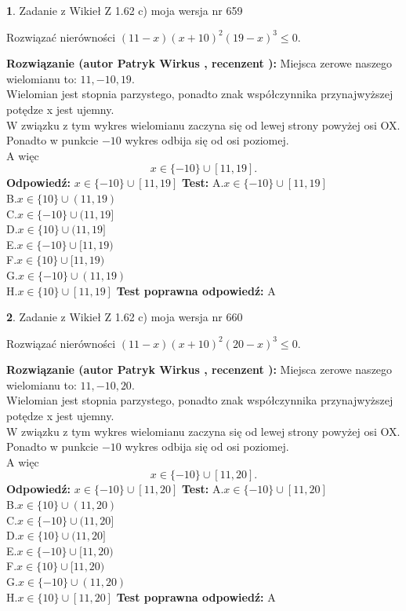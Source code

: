 \documentclass[12pt, a4paper]{article}
\theoremstyle{definition} %
\newtheorem{zad}{}
\newcommand{\zadStart}[1]{\begin{zad}#1\newline}
\newcommand{\zadStop}{\end{zad}}
\newcommand{\rozwStart}[2]{\noindent \textbf{Rozwiązanie (autor #1 , recenzent #2): }\newline}
\newcommand{\rozwStop}{\newline}
\newcommand{\odpStart}{\noindent \textbf{Odpowiedź:}\newline}
\newcommand{\odpStop}{\newline}
\newcommand{\testStart}{\noindent \textbf{Test:}\newline}
\newcommand{\testStop}{\newline}
\newcommand{\kluczStart}{\noindent \textbf{Test poprawna odpowiedź:}\newline}
\newcommand{\kluczStop}{\newline}
\begin{document}
\zadStart{Zadanie z Wikieł Z 1.62 c) moja wersja nr 659}

Rozwiązać nierówności $(11-x)(x+10)^{2}(19-x)^{3}\le0$.
\zadStop
\rozwStart{Patryk Wirkus}{}
Miejsca zerowe naszego wielomianu to: $11, -10, 19$.\\
Wielomian jest stopnia parzystego, ponadto znak współczynnika przy\linebreak najwyższej potędze x jest ujemny.\\ W związku z tym wykres wielomianu zaczyna się od lewej strony powyżej osi OX.\\
Ponadto w punkcie $-10$ wykres odbija się od osi poziomej.\\
A więc $$x \in \{-10\} \cup [11,19].$$
\rozwStop
\odpStart
$x \in \{-10\} \cup [11,19]$
\odpStop
\testStart
A.$x \in \{-10\} \cup [11,19]$\\
B.$x \in \{10\} \cup (11,19)$\\
C.$x \in \{-10\} \cup (11,19]$\\
D.$x \in \{10\} \cup (11,19]$\\
E.$x \in \{-10\} \cup [11,19)$\\
F.$x \in \{10\} \cup [11,19)$\\
G.$x \in \{-10\} \cup (11,19)$\\
H.$x \in \{10\} \cup [11,19]$
\testStop
\kluczStart
A
\kluczStop



\zadStart{Zadanie z Wikieł Z 1.62 c) moja wersja nr 660}

Rozwiązać nierówności $(11-x)(x+10)^{2}(20-x)^{3}\le0$.
\zadStop
\rozwStart{Patryk Wirkus}{}
Miejsca zerowe naszego wielomianu to: $11, -10, 20$.\\
Wielomian jest stopnia parzystego, ponadto znak współczynnika przy\linebreak najwyższej potędze x jest ujemny.\\ W związku z tym wykres wielomianu zaczyna się od lewej strony powyżej osi OX.\\
Ponadto w punkcie $-10$ wykres odbija się od osi poziomej.\\
A więc $$x \in \{-10\} \cup [11,20].$$
\rozwStop
\odpStart
$x \in \{-10\} \cup [11,20]$
\odpStop
\testStart
A.$x \in \{-10\} \cup [11,20]$\\
B.$x \in \{10\} \cup (11,20)$\\
C.$x \in \{-10\} \cup (11,20]$\\
D.$x \in \{10\} \cup (11,20]$\\
E.$x \in \{-10\} \cup [11,20)$\\
F.$x \in \{10\} \cup [11,20)$\\
G.$x \in \{-10\} \cup (11,20)$\\
H.$x \in \{10\} \cup [11,20]$
\testStop
\kluczStart
A
\kluczStop
\end{document}
